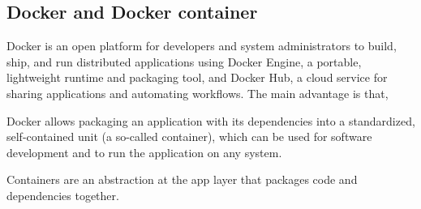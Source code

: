 
 
 
 


\subsection{Docker and Docker container}

Docker is an open platform for developers and system administrators to build, ship, and run distributed applications using Docker Engine, a portable, lightweight runtime and packaging tool, and Docker Hub, a cloud service for sharing applications and automating workflows. The main advantage is that,

Docker allows packaging an application with its dependencies into a standardized, self-contained unit (a so-called container), which can be used for software development and to run the application on any system.

 Containers are an abstraction at the app layer that packages code and dependencies together. 
 
\\
 
